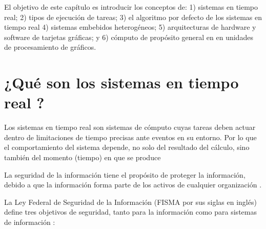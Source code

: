 

El objetivo de este capítulo es introducir los conceptos de: 1) sistemas en tiempo real; 2) tipos de ejecución de tareas; 3) el algoritmo por defecto de los sistemas en tiempo real 4) sistemas embebidos heterogéneos; 5) arquitecturas de hardware y software de tarjetas gráficas; y 6) cómputo de propósito general en en unidades de procesamiento de gráficos.
\section{¿Qué son los sistemas en tiempo real ?}\label{sec:segInfo}

Los sistemas en tiempo real son sistemas de cómputo cuyas tareas deben actuar dentro de limitaciones de tiempo precisas ante eventos en su entorno. Por lo que el comportamiento del sistema depende, no solo del resultado del cálculo, sino también del momento (tiempo) en que se produce \cite{Buta2011}

La seguridad de la información tiene el propósito de proteger la información, debido a que la información forma parte de los activos de cualquier organización \cite{peltier2016information}.  

\vspace{0.3cm}

La Ley Federal de Seguridad de la Información (FISMA por sus siglas en inglés) define tres objetivos de seguridad, tanto para la información como para sistemas de información \cite{Sta11,StaTec0409}: 

